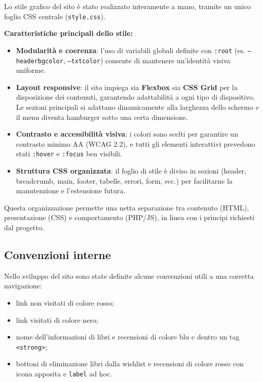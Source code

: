 \documentclass{article}
\begin{document}
Lo stile grafico del sito è stato realizzato interamente a mano, tramite un unico foglio CSS centrale (\texttt{style.css}).

\medskip

\noindent
\textbf{Caratteristiche principali dello stile:}
\begin{itemize}
    \item \textbf{Modularità e coerenza}: l’uso di variabili globali definite con \texttt{:root} (es. \texttt{--headerbgcolor}, \texttt{--txtcolor}) consente di mantenere un’identità visiva uniforme.
    \item \textbf{Layout responsive}: il sito impiega sia \textbf{Flexbox} sia \textbf{CSS Grid} per la disposizione dei contenuti, garantendo adattabilità a ogni tipo di dispositivo. Le sezioni principali si adattano dinamicamente alla larghezza dello schermo e il menu diventa hamburger sotto una certa dimensione.
    \item \textbf{Contrasto e accessibilità visiva}: i colori sono scelti per garantire un contrasto minimo AA (WCAG 2.2), e tutti gli elementi interattivi prevedono stati \texttt{:hover} e \texttt{:focus} ben visibili.
    \item \textbf{Struttura CSS organizzata}: il foglio di stile è diviso in sezioni (header, breadcrumb, main, footer, tabelle, errori, form, ecc.) per facilitarne la manutenzione e l’estensione futura.
\end{itemize}

\medskip

Questa organizzazione permette una netta separazione tra contenuto (HTML), presentazione (CSS) e comportamento (PHP/JS), in linea con i principi richiesti dal progetto.

\subsection{Convenzioni interne}
Nello sviluppo del sito sono state definite alcune convenzioni utili a una corretta navigazione:
\begin{itemize}
    \item link non visitati di colore rosso;
    \item link visitati di colore nero;
    \item nome dell'informazioni di libri e recensioni di colore blu e dentro un tag \texttt{<strong>};
    \item bottoni di eliminazione libri dalla wishlist e recensioni di colore rosso con icona apposita e \texttt{label} ad hoc.
\end{itemize}
\end{document}
